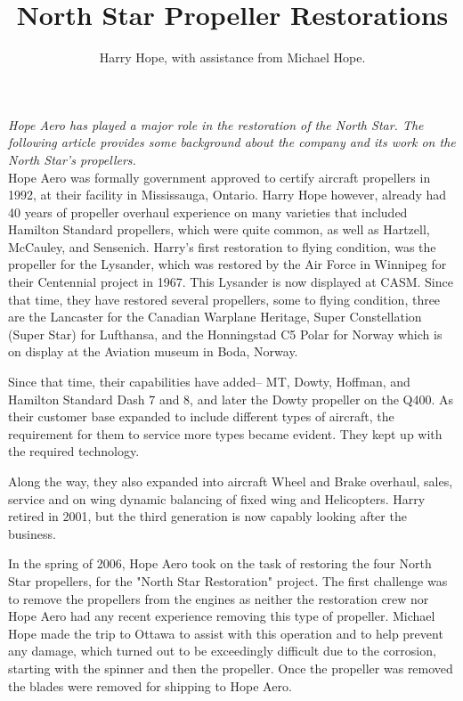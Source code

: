 %


\title{North Star Propeller Restorations}
\author{Harry Hope, with assistance from Michael Hope.}

\maketitle

\textit{Hope Aero has played a major role in the restoration of the North Star.
The following article provides some background about the company and its work
on the North Star's propellers. }\\

Hope Aero was formally government approved to certify aircraft propellers in
1992, at their facility in Mississauga, Ontario. Harry Hope however, already
had 40 years of propeller overhaul experience on many varieties that included
Hamilton Standard propellers, which were quite common, as well as Hartzell,
McCauley, and Sensenich. Harry's first restoration to flying condition, was the
propeller for the Lysander, which was restored by the Air Force in Winnipeg for
their Centennial project in 1967. This Lysander is now displayed at CASM. Since
that time, they have restored several propellers, some to flying condition,
three are the Lancaster for the Canadian Warplane Heritage, Super Constellation
(Super Star) for Lufthansa, and the Honningstad C5 Polar for Norway which is on
display at the Aviation museum in Boda, Norway. 

 Since that time, their capabilities have added– MT, Dowty, Hoffman, and
Hamilton Standard Dash 7 and 8, and later the Dowty propeller on the Q400.  As
their customer base expanded to include different types of aircraft, the
requirement for them to service more types became evident. They kept up with
the required technology.  

Along the way, they also expanded into aircraft Wheel and Brake overhaul,
sales, service and on wing dynamic balancing of fixed wing and Helicopters.
Harry retired in 2001, but the third generation is now capably looking after
the business.

In the spring of 2006, Hope Aero took on the task of restoring the four North
Star propellers, for the "North Star Restoration" project. The first challenge
was to remove the propellers from the engines as neither the restoration crew
nor Hope Aero had any recent experience removing this type of propeller.
Michael Hope made the trip to Ottawa to assist with this operation and to help
prevent any damage, which turned out to be exceedingly difficult due to the
corrosion, starting with the spinner and then the propeller. Once the propeller
was removed the blades were removed for shipping to Hope Aero. 

